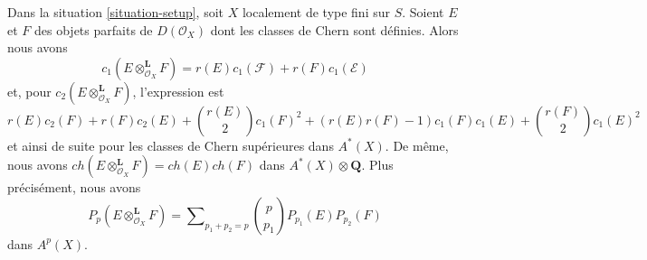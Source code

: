 \begin{lemma}
\label{lemma-chern-classes-perfect-tensor-product}
Dans la situation \ref{situation-setup}, soit $X$ localement de type fini sur $S$.
Soient $E$ et $F$ des objets parfaits de $D(\mathcal{O}_X)$ dont les classes de Chern
sont définies. Alors nous avons
$$
c_1(E \otimes_{\mathcal{O}_X}^\mathbf{L} F) =
r(E) c_1(\mathcal{F}) + r(F) c_1(\mathcal{E})
$$
et, pour $c_2(E \otimes_{\mathcal{O}_X}^\mathbf{L} F)$, l'expression est
$$
r(E) c_2(F) + r(F) c_2(E) + {r(E) \choose 2} c_1(F)^2 +
(r(E)r(F) - 1) c_1(F)c_1(E) + {r(F) \choose 2} c_1(E)^2
$$
et ainsi de suite pour les classes de Chern supérieures dans $A^*(X)$. De même, nous avons
$ch(E \otimes_{\mathcal{O}_X}^\mathbf{L} F) = ch(E) ch(F)$
dans $A^*(X) \otimes \mathbf{Q}$. Plus précisément, nous avons
$$
P_p(E \otimes_{\mathcal{O}_X}^\mathbf{L} F) = \sum\nolimits_{p_1 + p_2 = p}
{p \choose p_1} P_{p_1}(E) P_{p_2}(F)
$$
dans $A^p(X)$.
\end{lemma}

